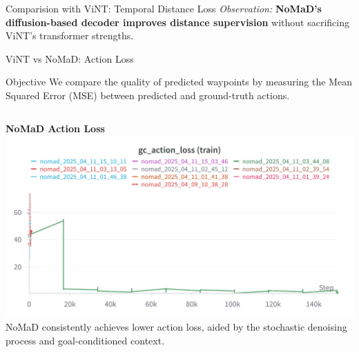 \documentclass{beamer}
\begin{document}
\begin{frame}{Comparision with ViNT: Temporal Distance Loss}
        \vspace{0.5em}
        \centering
        \textit{Observation:} \textbf{NoMaD’s diffusion-based decoder improves distance supervision} without sacrificing ViNT’s transformer strengths.
\end{frame}

\begin{frame}{ViNT vs NoMaD: Action Loss}
    \begin{block}{Objective}
        We compare the quality of predicted waypoints by measuring the Mean Squared Error (MSE) between predicted and ground-truth actions.
    \end{block}

    \begin{columns}
        \begin{column}{0.48\textwidth}
            \begin{block}{\centering \small \textbf{NoMaD Action Loss}}
                \centering
                \includegraphics[width=\textwidth]{images/gc_actionloss_nomad.png}
                \tiny NoMaD consistently achieves lower action loss, aided by the stochastic denoising process and goal-conditioned context.
            \end{block}
        \end{column}


\end{columns}
\end{frame}
\end{document}
